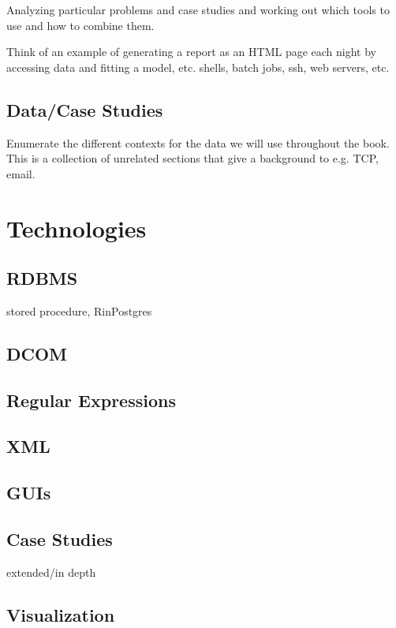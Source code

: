 \documentclass{book}
\begin{document}
Analyzing particular problems and case studies and working out which
tools to use and how to combine them.

Think of an example of generating a report as an HTML page each night
by accessing data and fitting a model, etc.
shells, batch jobs, ssh, web servers, etc.

\chapter{Data/Case Studies}
Enumerate the different contexts
for the data we will use throughout the book.
This is a collection of unrelated sections
that give a background to e.g. TCP, email.



\part{Technologies}

\chapter{RDBMS}
stored procedure, RinPostgres



\chapter{DCOM}

\chapter{Regular Expressions} 

\chapter{XML}

\chapter{GUIs}

\chapter{Case Studies}
extended/in depth

\chapter{Visualization}
\end{document}
